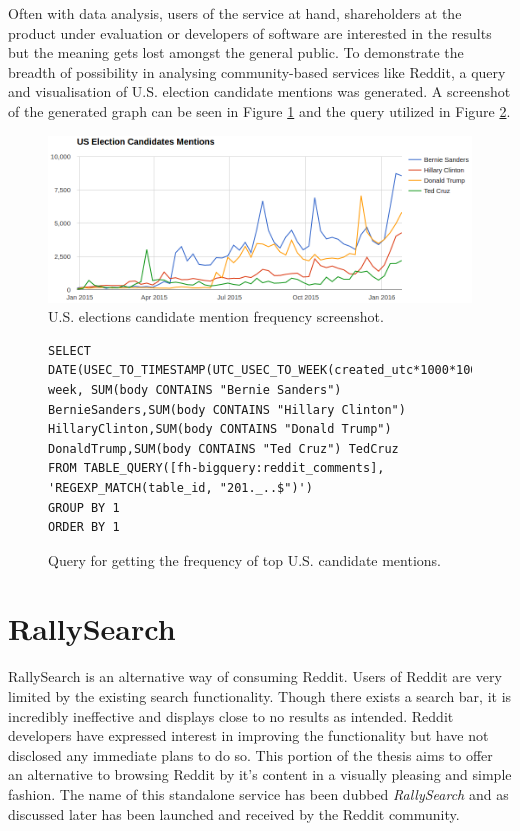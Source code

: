 \documentclass[msc,oneside]{ubcthesis}%
\begin{document}
Often with data analysis, users of the service at hand, shareholders at the product under evaluation or developers of software are interested in the results but the meaning gets lost amongst the general public. To demonstrate the breadth of possibility in analysing community-based services like Reddit, a query and visualisation of U.S. election candidate mentions was generated. A screenshot of the generated graph can be seen in Figure \ref{fig:uselectionsscreen} and the query utilized in Figure \ref{fig:ustopcand}.

\begin{figure}[H]
\includegraphics[width=\textwidth]{uselectionscreen.png}
\caption[U.S. elections candidate mention frequency]{
U.S. elections candidate mention frequency screenshot.}
\label{fig:uselectionsscreen}
\end{figure}

\begin{figure}[H]
\begin{center}
\begin{lstlisting}
SELECT DATE(USEC_TO_TIMESTAMP(UTC_USEC_TO_WEEK(created_utc*1000*1000,1))) week, SUM(body CONTAINS "Bernie Sanders") BernieSanders,SUM(body CONTAINS "Hillary Clinton") HillaryClinton,SUM(body CONTAINS "Donald Trump") DonaldTrump,SUM(body CONTAINS "Ted Cruz") TedCruz 
FROM TABLE_QUERY([fh-bigquery:reddit_comments], 'REGEXP_MATCH(table_id, "201._..$")') 
GROUP BY 1 
ORDER BY 1
\end{lstlisting}
\end{center}
\caption[Query for getting the frequency of U.S. candidate mentions]{
Query for getting the frequency of top U.S. candidate mentions.}
\label{fig:ustopcand}
\end{figure}

\section{RallySearch}
RallySearch is an alternative way of consuming Reddit. Users of Reddit are very limited by the existing search functionality. Though there exists a search bar, it is incredibly ineffective and displays close to no results as intended. Reddit developers have expressed interest in improving the functionality but have not disclosed any immediate plans to do so. This portion of the thesis aims to offer an alternative to browsing Reddit by it's content in a visually pleasing and simple fashion. The name of this standalone service has been dubbed \textit{RallySearch} and as discussed later has been launched and received by the Reddit community.
\end{document}
